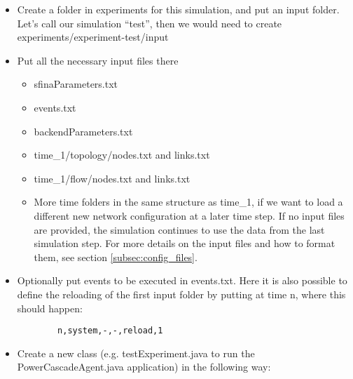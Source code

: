 \documentclass[11pt,fleqn]{book} %
\newcommand{\CascadeAgent}{CascadeAgent}
\newcommand{\backendParametersFile}{backendParameters.txt}
\newcommand{\sfinaParametersFile}{sfinaParameters.txt}
\begin{document}
\begin{itemize}
	\item Create a folder in experiments for this simulation, and put an input folder. Let’s call our simulation “test”, then we would need to create experiments/experiment-test/input
	\item Put all the necessary input files there
	\begin{itemize}
		\item \sfinaParametersFile{}
		\item events.txt
		\item \backendParametersFile{}
		\item time\_1/topology/nodes.txt and links.txt
		\item time\_1/flow/nodes.txt and links.txt
		\item More time folders in the same structure as time\_1, if we want to load a different new network configuration at a later time step. If no input files are provided, the simulation continues to use the data from the last simulation step. For more details on the input files and how to format them, see section \ref{subsec:config_files}.
	\end{itemize}
	\item Optionally put events to be executed in events.txt. Here it is also possible to define the reloading of the first input folder by putting at time n, where this should happen:
	\begin{lstlisting}
		n,system,-,-,reload,1
	\end{lstlisting}
	\item  Create a new class (e.g. testExperiment.java to run the Power\CascadeAgent{}.java application) in the following way:
\end{itemize}
\end{document}
